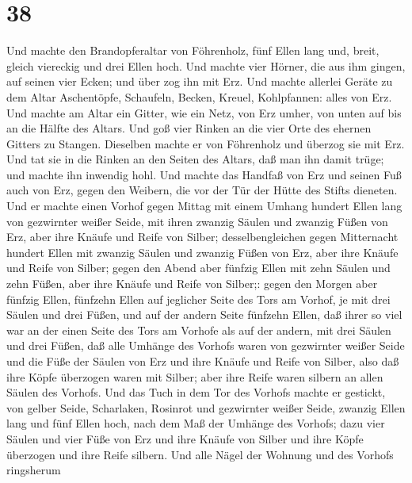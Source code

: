 \hypertarget{section-37}{%
\section{38}\label{section-37}}

 Und machte den Brandopferaltar von Föhrenholz, fünf Ellen
lang und, breit, gleich viereckig und drei Ellen hoch.  Und
machte vier Hörner, die aus ihm gingen, auf seinen vier Ecken; und über
zog ihn mit Erz.  Und machte allerlei Geräte zu dem Altar
Aschentöpfe, Schaufeln, Becken, Kreuel, Kohlpfannen: alles von Erz.
 Und machte am Altar ein Gitter, wie ein Netz, von Erz
umher, von unten auf bis an die Hälfte des Altars.  Und goß
vier Rinken an die vier Orte des ehernen Gitters zu Stangen.
 Dieselben machte er von Föhrenholz und überzog sie mit Erz.
 Und tat sie in die Rinken an den Seiten des Altars, daß man
ihn damit trüge; und machte ihn inwendig hohl.  Und machte
das Handfaß von Erz und seinen Fuß auch von Erz, gegen den Weibern, die
vor der Tür der Hütte des Stifts dieneten.  Und er machte
einen Vorhof gegen Mittag mit einem Umhang hundert Ellen lang von
gezwirnter weißer Seide,  mit ihren zwanzig Säulen und
zwanzig Füßen von Erz, aber ihre Knäufe und Reife von Silber;
 desselbengleichen gegen Mitternacht hundert Ellen mit
zwanzig Säulen und zwanzig Füßen von Erz, aber ihre Knäufe und Reife von
Silber;  gegen den Abend aber fünfzig Ellen mit zehn Säulen
und zehn Füßen, aber ihre Knäufe und Reife von Silber;: 
gegen den Morgen aber fünfzig Ellen,  fünfzehn Ellen auf
jeglicher Seite des Tors am Vorhof, je mit drei Säulen und drei Füßen,
 und auf der andern Seite fünfzehn Ellen, daß ihrer so viel
war an der einen Seite des Tors am Vorhofe als auf der andern, mit drei
Säulen und drei Füßen,  daß alle Umhänge des Vorhofs waren
von gezwirnter weißer Seide  und die Füße der Säulen von
Erz und ihre Knäufe und Reife von Silber, also daß ihre Köpfe überzogen
waren mit Silber; aber ihre Reife waren silbern an allen Säulen des
Vorhofs.  Und das Tuch in dem Tor des Vorhofs machte er
gestickt, von gelber Seide, Scharlaken, Rosinrot und gezwirnter weißer
Seide, zwanzig Ellen lang und fünf Ellen hoch, nach dem Maß der Umhänge
des Vorhofs;  dazu vier Säulen und vier Füße von Erz und
ihre Knäufe von Silber und ihre Köpfe überzogen und ihre Reife silbern.
 Und alle Nägel der Wohnung und des Vorhofs ringsherum
